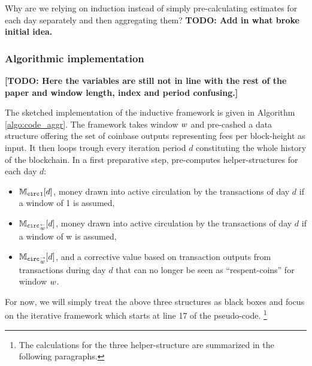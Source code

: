 Why are we relying on induction instead of simply pre-calculating estimates for each day separately and then aggregating them? %
\textbf{TODO: Add in what broke initial idea.}


\subsubsection{Algorithmic implementation}
\label{sec:novel_impl_algo}%
\textbf{[TODO: Here the variables are still not in line with the rest of the paper and window length, index and period confusing.]}

The sketched implementation of the inductive framework is given in Algorithm \ref{algo:code_aggr}. %
The framework takes window \({w}\) and pre-cashed a data structure offering the set of coinbase outputs representing fees per block-height as input. %
It then loops trough every iteration period \(d\) constituting the whole history of the blockchain. %
In a first preparative step, pre-computes helper-structures for each day \(d\):
\begin{itemize}
\item \( {\mathbb{M}_{\mathtt{circ}}}_{1}[d] \), money drawn into active circulation by the transactions of day \( d \) if a window of 1 is assumed,
\item \( {{\mathbb{M}_{\mathtt{circ}}}_{\overset{\leftarrow}{{w}}}}[d] \), money drawn into active circulation by the transactions of day \(d\) if a window of w is assumed,
\item \( {{\mathbb{M}_{\mathtt{circ}}}_{\overset{\rightarrow}{{w}}}}[d] \), and a corrective value based on transaction outputs from transactions during day \(d\) that can no longer be seen as ``respent-coins'' for window \({w}\).  
\end{itemize}

For now, we will simply treat the above three structures as black boxes and focus on the iterative framework which starts at line 17 of the pseudo-code.%
\footnote{The calculations for the three helper-structure are summarized in the following paragraphs.} %


